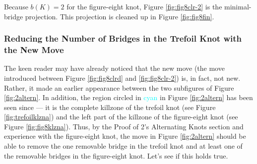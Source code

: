 \documentclass[titlepage]{article}
\begin{document}
Because $b(K)=2$ for the figure-eight knot, Figure \ref{fig:fig8clr-2} is the minimal-bridge projection. This projection is cleaned up in Figure \ref{fig:fig8fin}.


\subsubsection{Reducing the Number of Bridges in the Trefoil Knot with the New Move}\label{ss2:trefoilreduce-2}
The keen reader may have already noticed that the new move (the move introduced between Figure \ref{fig:fig8clrd} and \ref{fig:fig8clr-2}) is, in fact, not new. Rather, it made an earlier appearance between the two subfigures of Figure \ref{fig:2altern}. In addition, the region circled in \textcolor{cyan}{cyan} in Figure \ref{fig:2altern} has been seen since --- it is the complete killzone of the trefoil knot (see Figure \ref{fig:trefoilklzna}) and the left part of the killzone of the figure-eight knot (see Figure \ref{fig:fig8klzna}). Thus, by the Proof of 2's Alternating Knots section and experience with the figure-eight knot, the move in Figure \ref{fig:2altern} should be able to remove the one removable bridge in the trefoil knot and at least one of the removable bridges in the figure-eight knot. Let's see if this holds true.\par
\end{document}
